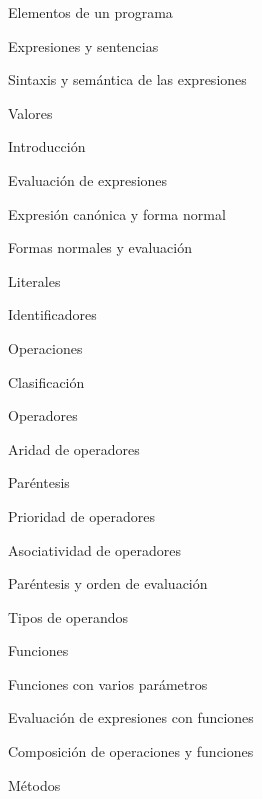 \begin{longenum}
\begin{longenum}
        \item Elementos de un programa
        \begin{longenum}
            \item Expresiones y sentencias
            \item Sintaxis y semántica de las expresiones
        \end{longenum}
        \item Valores
        \begin{longenum}
            \item Introducción
            \item Evaluación de expresiones
            \item Expresión canónica y forma normal
            \item Formas normales y evaluación
            \item Literales
            \item Identificadores
        \end{longenum}
        \item Operaciones
        \begin{longenum}
            \item Clasificación
            \item Operadores
            \begin{longenum}
                \item Aridad de operadores
                \item Paréntesis
                \item Prioridad de operadores
                \item Asociatividad de operadores
                \item Paréntesis y orden de evaluación
                \item Tipos de operandos
            \end{longenum}
            \item Funciones
            \begin{longenum}
                \item Funciones con varios parámetros
                \item Evaluación de expresiones con funciones
                \item Composición de operaciones y funciones
            \end{longenum}
            \item Métodos
        \end{longenum}

\end{longenum}
\end{longenum}
